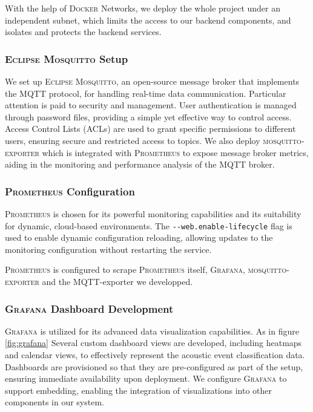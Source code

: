 With the help of \textsc{Docker} Networks, we deploy the whole project under an independent subnet, which limits the access to our backend components, and isolates and protects the backend services.

\subsubsection{\textsc{Eclipse Mosquitto} Setup}
We set up \textsc{Eclipse Mosquitto}, an open-source message broker that implements the MQTT protocol, for handling real-time data communication. Particular attention is paid to security and management. User authentication is managed through password files, providing a simple yet effective way to control access. Access Control Lists (ACLs) are used to grant specific permissions to different users, ensuring secure and restricted access to topics. We also deploy \textsc{mosquitto-exporter}\cite{mosquittoexporter} which is integrated with \textsc{Prometheus} to expose message broker metrics, aiding in the monitoring and performance analysis of the MQTT broker.

\subsubsection{\textsc{Prometheus} Configuration}
\textsc{Prometheus} is chosen for its powerful monitoring capabilities and its suitability for dynamic, cloud-based environments. The \texttt{\lstinline{--web.enable-lifecycle}} flag is used to enable dynamic configuration reloading, allowing updates to the monitoring configuration without restarting the service.

\textsc{Prometheus} is configured to scrape \textsc{Prometheus} itself, \textsc{Grafana}, \textsc{mosquitto-exporter} and the MQTT-exporter we developped.

\subsubsection{\textsc{Grafana} Dashboard Development}
\textsc{Grafana} is utilized for its advanced data visualization capabilities. As in figure \ref{fig:grafana} Several custom dashboard views are developed, including heatmaps and calendar views, to effectively represent the acoustic event classification data. Dashboards are provisioned so that they are pre-configured as part of the setup, ensuring immediate availability upon deployment. We configure \textsc{Grafana} to support embedding, enabling the integration of visualizations into other components in our system.

